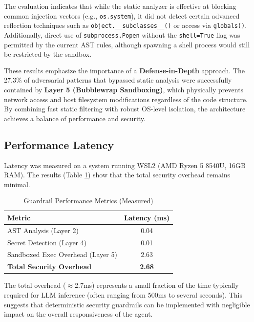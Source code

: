 \documentclass[conference]{IEEEtran}
\begin{document}
The evaluation indicates that while the static analyzer is effective at blocking common injection vectors (e.g., \texttt{os.system}), it did not detect certain advanced reflection techniques such as \texttt{object.\_\_subclasses\_\_()} or access via \texttt{globals()}. Additionally, direct use of \texttt{subprocess.Popen} without the \texttt{shell=True} flag was permitted by the current AST rules, although spawning a shell process would still be restricted by the sandbox.

These results emphasize the importance of a \textbf{Defense-in-Depth} approach. The 27.3\% of adversarial patterns that bypassed static analysis were successfully contained by \textbf{Layer 5 (Bubblewrap Sandboxing)}, which physically prevents network access and host filesystem modifications regardless of the code structure. By combining fast static filtering with robust OS-level isolation, the architecture achieves a balance of performance and security.

\subsection{Performance Latency}
Latency was measured on a system running WSL2 (AMD Ryzen 5 8540U, 16GB RAM). The results (Table \ref{tab:guardrail_perf}) show that the total security overhead remains minimal.

\begin{table}[htbp]
\caption{Guardrail Performance Metrics (Measured)}
\begin{center}
\begin{tabular}{|l|c|}
\hline
\textbf{Metric} & \textbf{Latency (ms)} \\
\hline
AST Analysis (Layer 2) & 0.04 \\
Secret Detection (Layer 4) & 0.01 \\
Sandboxed Exec Overhead (Layer 5) & 2.63 \\
\hline
\textbf{Total Security Overhead} & \textbf{2.68} \\
\hline
\end{tabular}
\label{tab:guardrail_perf}
\end{center}
\end{table}

The total overhead ($\approx$2.7ms) represents a small fraction of the time typically required for LLM inference (often ranging from 500ms to several seconds). This suggests that deterministic security guardrails can be implemented with negligible impact on the overall responsiveness of the agent.
\end{document}

